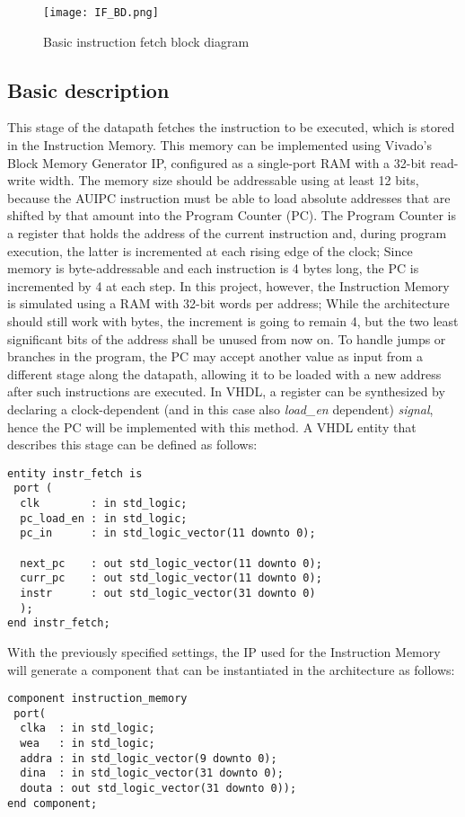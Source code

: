 \begin{figure}[ht!]
  \centering
  \texttt{[image: IF\_BD.png]}
  \caption{Basic instruction fetch block diagram}
  \label{fig:IF_BD}
\end{figure}
\subsection{Basic description}
This stage of the datapath fetches the instruction to be executed, which is stored in the Instruction Memory. This memory can be implemented using Vivado's Block Memory Generator IP, configured as a single-port RAM with a 32-bit read-write width. The memory size should be addressable using at least 12 bits, because the AUIPC instruction must be able to load absolute addresses that are shifted by that amount into the Program Counter (PC).
The Program Counter is a register that holds the address of the current instruction and, during program execution, the latter is incremented at each rising edge of the clock; Since memory is byte-addressable and each instruction is 4 bytes long, the PC is incremented by 4 at each step. 
In this project, however, the Instruction Memory is simulated using a RAM with 32-bit words per address; While the architecture should still work with bytes, the increment is going to remain 4, but the two least significant bits of the address shall be unused from now on.
To handle jumps or branches in the program, the PC may accept another value as input from a different stage along the datapath, allowing it to be loaded with a new address after such instructions are executed.
In VHDL, a register can be synthesized by declaring a clock-dependent (and in this case also \emph{load{\_}en} dependent) \emph{signal}, hence the PC will be implemented with this method.
A VHDL entity that describes this stage can be defined as follows:\\
\begin{verbatim}
entity instr_fetch is
 port ( 
  clk        : in std_logic;
  pc_load_en : in std_logic;
  pc_in      : in std_logic_vector(11 downto 0);

  next_pc    : out std_logic_vector(11 downto 0);
  curr_pc    : out std_logic_vector(11 downto 0);
  instr      : out std_logic_vector(31 downto 0)
  );
end instr_fetch;
\end{verbatim}
\vspace{1\baselineskip}
With the previously specified settings, the IP used for the Instruction Memory will generate a component that can be instantiated in the architecture as follows:\\
\begin{verbatim}
component instruction_memory
 port(
  clka  : in std_logic;
  wea   : in std_logic;
  addra : in std_logic_vector(9 downto 0);
  dina  : in std_logic_vector(31 downto 0);
  douta : out std_logic_vector(31 downto 0));
end component;
\end{verbatim}
\vspace{1\baselineskip}

